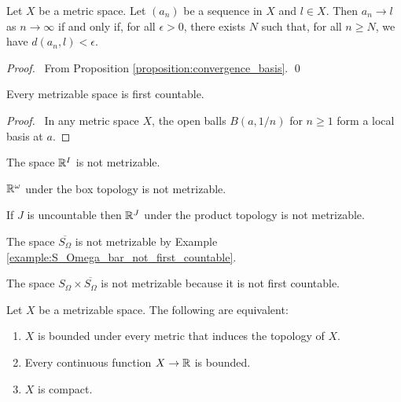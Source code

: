 \begin{proposition}
    \label{proposition:convergence_metric}
    Let $X$ be a metric space. Let $(a_n)$ be a sequence in $X$ and $l \in X$.
    Then $a_n \rightarrow l$ as $n \rightarrow \infty$ if and only if,
    for all $\epsilon > 0$, there exists $N$ such that, for all $n \geq N$,
    we have $d(a_n, l) < \epsilon$.
\end{proposition}

\begin{proof}
    \pf\ From Proposition \ref{proposition:convergence_basis}. \qed
\end{proof}

\begin{proposition}
    \label{proposition:metrizable_first_countable}
    Every metrizable space is first countable.
\end{proposition}

\begin{proof}
    \pf\ In any metric space $X$, the open balls $B(a,1/n)$ for $n \geq 1$ form a local basis at $a$.
\end{proof}

\begin{corollary}
    The space $\mathbb{R}^I$ is not metrizable.
\end{corollary}

\begin{example}
    $\mathbb{R}^\omega$ under the box topology is not metrizable.
\end{example}

\begin{example}
    If $J$ is uncountable then $\mathbb{R}^J$ under the product topology is not metrizable.
\end{example}

\begin{example}
    The space $\overline{S_\Omega}$ is not metrizable by Example \ref{example:S_Omega_bar_not_first_countable}.
\end{example}

\begin{example}
    The space $S_\Omega \times \overline{S_\Omega}$ is not metrizable because it is not first countable.
\end{example}

\begin{proposition}[Choice]
    \label{proposition:compact_bounded}
    Let $X$ be a metrizable space. The following are equivalent:
    \begin{enumerate}
        \item $X$ is bounded under every metric that induces the topology of $X$.
        \item Every continuous function $X \rightarrow \mathbb{R}$ is bounded.
        \item $X$ is compact.
    \end{enumerate}
\end{proposition}

